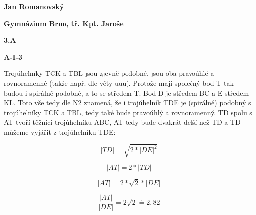 \documentclass{article}
\title{\vspace{-2cm}\vspace{-1.7cm}}
\date{}
\author{}
\begin{document}
\maketitle
\noindent \textbf{Jan Romanovský}

\noindent \textbf{Gymnázium Brno, tř. Kpt. Jaroše}

\noindent \textbf{3.A}

\noindent \textbf{A-\textrm{I}-3}

\textbf{ }

Trojúhelníky TCK a TBL jsou zjevně podobné, jsou oba pravoúhlé a rovnoramenné (takže např. dle věty uuu). Protože mají společný bod T tak budou i spirálně podobné, a to se středem T. Bod D je středem BC a E středem KL. Toto vše tedy dle N2 znamená, že i trojúhelník TDE je (spirálně) podobný s trojúhelníky TCK a TBL, tedy také bude pravoúhlý a rovnoramenný. TD spolu s AT tvoří těžnici trojúhelníku ABC, AT tedy bude dvakrát delší než TD a TD můžeme vyjářit z trojúhelníku TDE:

  \[|TD|=\sqrt{2*|DE|^2}\]

  \[|AT|=2*|TD|\]

  \[|AT|=2*\sqrt{2}*|DE|\]

  \[\frac{|AT|}{|DE|}=2\sqrt{2}\doteq2,82\]
\end{document}
